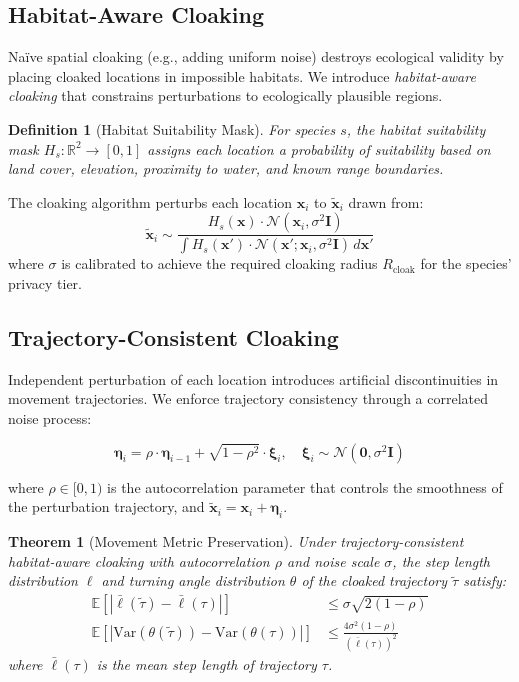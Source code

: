 \documentclass[11pt,letterpaper]{article}
\newtheorem{theorem}{Theorem}[section]
\newtheorem{definition}{Definition}[section]
\begin{document}
\subsection{Habitat-Aware Cloaking}

Na\"ive spatial cloaking (e.g., adding uniform noise) destroys ecological validity by placing cloaked locations in impossible habitats. We introduce \emph{habitat-aware cloaking} that constrains perturbations to ecologically plausible regions.

\begin{definition}[Habitat Suitability Mask]
For species $s$, the habitat suitability mask $H_s: \mathbb{R}^2 \to [0, 1]$ assigns each location a probability of suitability based on land cover, elevation, proximity to water, and known range boundaries.
\end{definition}

The cloaking algorithm perturbs each location $\mathbf{x}_i$ to $\tilde{\mathbf{x}}_i$ drawn from:
\begin{equation}
\tilde{\mathbf{x}}_i \sim \frac{H_s(\mathbf{x}) \cdot \mathcal{N}(\mathbf{x}_i, \sigma^2 \mathbf{I})}{\int H_s(\mathbf{x}') \cdot \mathcal{N}(\mathbf{x}'; \mathbf{x}_i, \sigma^2 \mathbf{I}) \, d\mathbf{x}'}
\end{equation}
where $\sigma$ is calibrated to achieve the required cloaking radius $R_{\text{cloak}}$ for the species' privacy tier.

\subsection{Trajectory-Consistent Cloaking}

Independent perturbation of each location introduces artificial discontinuities in movement trajectories. We enforce trajectory consistency through a correlated noise process:

\begin{equation}
\boldsymbol{\eta}_i = \rho \cdot \boldsymbol{\eta}_{i-1} + \sqrt{1 - \rho^2} \cdot \boldsymbol{\xi}_i, \quad \boldsymbol{\xi}_i \sim \mathcal{N}(\mathbf{0}, \sigma^2 \mathbf{I})
\end{equation}

where $\rho \in [0, 1)$ is the autocorrelation parameter that controls the smoothness of the perturbation trajectory, and $\tilde{\mathbf{x}}_i = \mathbf{x}_i + \boldsymbol{\eta}_i$.

\begin{theorem}[Movement Metric Preservation]
\label{thm:preservation}
Under trajectory-consistent habitat-aware cloaking with autocorrelation $\rho$ and noise scale $\sigma$, the step length distribution $\ell$ and turning angle distribution $\theta$ of the cloaked trajectory $\tilde{\tau}$ satisfy:
\begin{align}
\mathbb{E}[|\bar{\ell}(\tilde{\tau}) - \bar{\ell}(\tau)|] &\leq \sigma\sqrt{2(1-\rho)} \\
\mathbb{E}[|\text{Var}(\theta(\tilde{\tau})) - \text{Var}(\theta(\tau))|] &\leq \frac{4\sigma^2(1-\rho)}{(\bar{\ell}(\tau))^2}
\end{align}
where $\bar{\ell}(\tau)$ is the mean step length of trajectory $\tau$.
\end{theorem}
\end{document}
